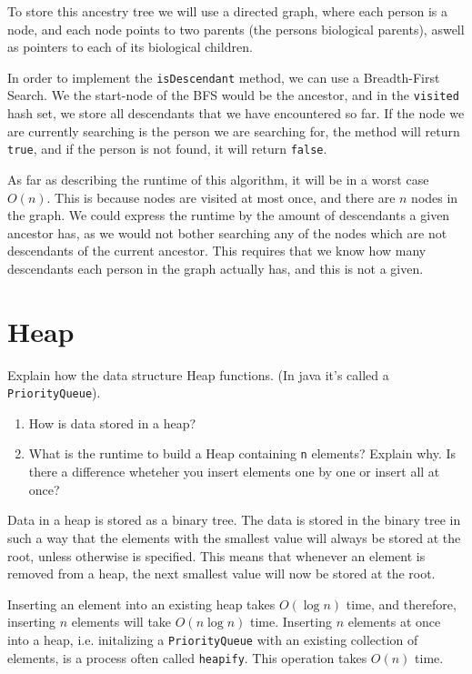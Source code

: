 \documentclass{article}
\begin{document}
    \begin{ans}
        To store this ancestry tree we will use a directed graph, where each person is a node, and each node points to two parents (the persons biological parents), aswell as pointers to each of its biological children.
        \medskip

        In order to implement the \texttt{isDescendant} method, we can use a Breadth-First Search. We the start-node of the BFS would be the ancestor, and in the \texttt{visited} hash set, we store all descendants that we have encountered so far. If the node we are currently searching is the person we are searching for, the method will return \texttt{true}, and if the person is not found, it will return \texttt{false}.
        \medskip

        As far as describing the runtime of this algorithm, it will be in a worst case \( O\left( n \right) \). This is because nodes are visited at most once, and there are \( n \) nodes in the graph. We could express the runtime by the amount of descendants a given ancestor has, as we would not bother searching any of the nodes which are not descendants of the current ancestor. This requires that we know how many descendants each person in the graph actually has, and this is not a given.
    \end{ans}

    \section{Heap}
    Explain how the data structure Heap functions. (In java it's called a \texttt{PriorityQueue}).

    \begin{enumerate}
        \item How is data stored in a heap?
        \item What is the runtime to build a Heap containing \texttt{n} elements? Explain why. Is there a difference wheteher you insert elements one by one or insert all at once?
    \end{enumerate}

    \begin{ans}
        Data in a heap is stored as a binary tree. The data is stored in the binary tree in such a way that the elements with the smallest value will always be stored at the root, unless otherwise is specified. This means that whenever an element is removed from a heap, the next smallest value will now be stored at the root.
        \medskip

        Inserting an element into an existing heap takes \( O\left( \log n \right) \) time, and therefore, inserting \( n \) elements will take \( O\left( n \log n \right) \) time. Inserting \( n \) elements at once into a heap, i.e. initalizing a \texttt{PriorityQueue} with an existing collection of elements, is a process often called \texttt{heapify}. This operation takes \( O(n) \) time.
    \end{ans}
\end{document}
